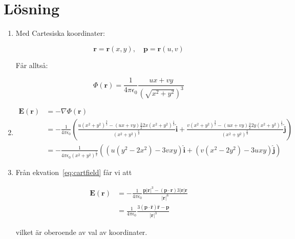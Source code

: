 \documentclass{article}
\renewcommand{\vec}[1]{\mathbf{#1}}
\begin{document}
\section*{Lösning}
\begin{enumerate}
	\item Med Cartesiska koordinater:

		$$ \vec r = \vec r(x, y), \quad \vec p = \vec r(u, v) $$

		Får alltså:

		$$ \Phi(\vec r) = \frac1{4\pi\epsilon_0} \frac{ux + vy}{(\sqrt{x^2 + y^2})^3} $$

	\item

		\begin{equation}
			\begin{split}
				\vec E(\vec r) &= -\nabla \Phi(\vec r) \\
				&= -\frac1{4\pi\epsilon_0} \left(
				\frac{u (x^2 + y^2)^\frac32 - (ux + vy) \frac32 2x (x^2 + y^2)^\frac12}{(x^2 + y^2)^\frac62} \vec{\hat{i}}
				+ \frac{v (x^2 + y^2)^\frac32 - (ux + vy) \frac32 2y (x^2 + y^2)^\frac12}{(x^2 + y^2)^\frac62} \vec{\hat{j}}
				\right) \\
				&= -\frac1{4\pi\epsilon_0 (x^2 + y^2)^\frac52} \left(
				(u (y^2 - 2x^2) - 3vxy) \vec{\hat{i}}
				+ (v (x^2 - 2y^2) - 3uxy) \vec{\hat{j}}
				\right)
			\end{split}
			\label{eq:cartfield}
		\end{equation}

	\item Från ekvation~\ref{eq:cartfield} får vi att

		\begin{equation*}
			\begin{split}
				\vec E(\vec r) &= -\frac1{4\pi\epsilon_0} \frac{\vec p \lvert\vec r\rvert^3 - (\vec p \cdot \vec r) 3 \lvert\vec r\rvert \vec r}{\lvert\vec r\rvert^6} \\
				&= \frac1{4\pi\epsilon_0} \frac{3 (\vec p \cdot \vec{\hat r}) \vec{\hat r} - \vec p}{\lvert \vec r\rvert^3}
			\end{split}
		\end{equation*}

		vilket är oberoende av val av koordinater.

		\begin{comment}
			Med godtyckligt ONHS $(u_1, u_2)$: $\vec r = \vec r(u_1, u_2)$, sätt

			$$ h_i = \left\lvert \frac{\partial \vec r}{\partial \vec u_i} \right\rvert, \quad
			\vec e_i = \frac1{h_i} \frac{\partial \vec r}{\partial u_i}, \quad i = 1, 2 $$


\end{comment}
\end{enumerate}
\end{document}
